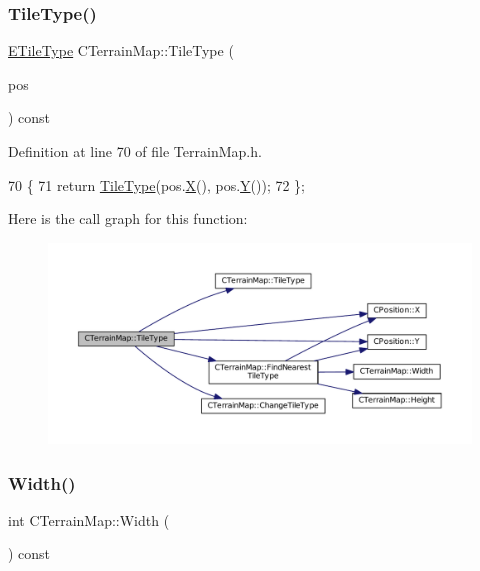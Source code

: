 \subsubsection{\texorpdfstring{Tile\+Type()}{TileType()}\hspace{0.1cm}{\footnotesize\ttfamily [2/2]}}
{\footnotesize\ttfamily \hyperlink{classCTerrainMap_aff2ab991e237269941416dd79d8871d4}{E\+Tile\+Type} C\+Terrain\+Map\+::\+Tile\+Type (\begin{DoxyParamCaption}\item[{const \hyperlink{classCPosition}{C\+Position} \&}]{pos }\end{DoxyParamCaption}) const\hspace{0.3cm}{\ttfamily [inline]}}



Definition at line 70 of file Terrain\+Map.\+h.


\begin{DoxyCode}
70                                                       \{
71             \textcolor{keywordflow}{return} \hyperlink{classCTerrainMap_a7e0e440467a09cb1c59e2bdbec01ccb4}{TileType}(pos.\hyperlink{classCPosition_a9a6b94d3b91df1492d166d9964c865fc}{X}(), pos.\hyperlink{classCPosition_a1aa8a30e2f08dda1f797736ba8c13a87}{Y}());
72         \};
\end{DoxyCode}
Here is the call graph for this function\+:\nopagebreak
\begin{figure}[H]
\begin{center}
\leavevmode
\includegraphics[width=350pt]{classCTerrainMap_a3a7229412b3391835dd6036439e5c6c0_cgraph}
\end{center}
\end{figure}
\hypertarget{classCTerrainMap_a34cb754aa9b26e85a73377159f2527d7}{}\label{classCTerrainMap_a34cb754aa9b26e85a73377159f2527d7} 
\subsubsection{\texorpdfstring{Width()}{Width()}}
{\footnotesize\ttfamily int C\+Terrain\+Map\+::\+Width (\begin{DoxyParamCaption}{ }\end{DoxyParamCaption}) const}



